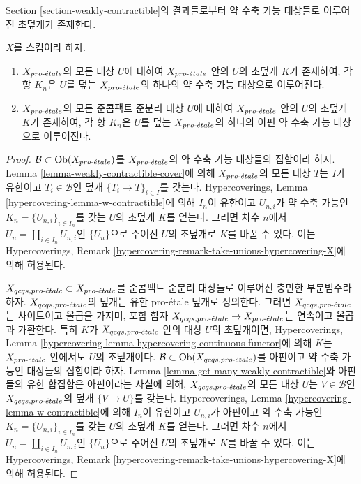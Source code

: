 \noindent
Section \ref{section-weakly-contractible}의 결과들로부터 약 수축 가능
대상들로 이루어진 초덮개가 존재한다.

\begin{lemma}
\label{lemma-w-contractible-hypercovering}
$X$를 스킴이라 하자.
\begin{enumerate}
\item $X_{pro\text{-}\acute{e}tale}$의 모든 대상 $U$에 대하여 $X_{pro\text{-}\acute{e}tale}$ 안의 $U$의
초덮개 $K$가 존재하여, 각 항 $K_n$은 $U$를 덮는 $X_{pro\text{-}\acute{e}tale}$의
하나의 약 수축 가능 대상으로 이루어진다.
\item $X_{pro\text{-}\acute{e}tale}$의 모든 준콤팩트 준분리 대상 $U$에 대하여
$X_{pro\text{-}\acute{e}tale}$ 안의 $U$의 초덮개 $K$가 존재하여, 각 항 $K_n$은
$U$를 덮는 $X_{pro\text{-}\acute{e}tale}$의 하나의 아핀 약 수축 가능 대상으로
이루어진다.
\end{enumerate}
\end{lemma}

\begin{proof}
$\mathcal{B} \subset \mathop{\mathrm{Ob}}\nolimits(X_{pro\text{-}\acute{e}tale})$를 $X_{pro\text{-}\acute{e}tale}$의 약 수축 가능
대상들의 집합이라 하자. Lemma \ref{lemma-weakly-contractible-cover}에
의해 $X_{pro\text{-}\acute{e}tale}$의 모든 대상 $T$는 $I$가 유한이고
$T_i \in \mathcal{B}$인 덮개 $\{T_i \to T\}_{i \in I}$를 갖는다.
Hypercoverings, Lemma \ref{hypercovering-lemma-w-contractible}에 의해
$I_n$이 유한이고 $U_{n, i}$가 약 수축 가능인
$K_n = \{U_{n, i}\}_{i \in I_n}$를 갖는 $U$의 초덮개 $K$를 얻는다.
그러면 차수 $n$에서 $U_n = \coprod_{i \in I_n} U_{n, i}$인
$\{U_n\}$으로 주어진 $U$의 초덮개로 $K$를 바꿀 수 있다.
이는 Hypercoverings, Remark
\ref{hypercovering-remark-take-unions-hypercovering-X}에 의해 허용된다.

\medskip\noindent
$X_{qcqs, {pro\text{-}\acute{e}tale}} \subset X_{pro\text{-}\acute{e}tale}$를 준콤팩트 준분리 대상들로
이루어진 충만한 부분범주라 하자. $X_{qcqs, {pro\text{-}\acute{e}tale}}$의 덮개는 유한
pro-\'etale 덮개로 정의한다. 그러면 $X_{qcqs, {pro\text{-}\acute{e}tale}}$는 사이트이고
올곱을 가지며, 포함 함자
$X_{qcqs, {pro\text{-}\acute{e}tale}} \to X_{pro\text{-}\acute{e}tale}$는 연속이고 올곱과 가환한다.
특히 $K$가 $X_{qcqs, {pro\text{-}\acute{e}tale}}$ 안의 대상 $U$의 초덮개이면,
Hypercoverings, Lemma
\ref{hypercovering-lemma-hypercovering-continuous-functor}에 의해 $K$는
$X_{pro\text{-}\acute{e}tale}$ 안에서도 $U$의 초덮개이다.
$\mathcal{B} \subset \mathop{\mathrm{Ob}}\nolimits(X_{qcqs, {pro\text{-}\acute{e}tale}})$를 아핀이고 약 수축
가능인 대상들의 집합이라 하자.
Lemma \ref{lemma-get-many-weakly-contractible}와 아핀들의 유한 합집합은
아핀이라는 사실에 의해, $X_{qcqs, {pro\text{-}\acute{e}tale}}$의 모든 대상 $U$는
$V \in \mathcal{B}$인 $X_{qcqs, {pro\text{-}\acute{e}tale}}$의 덮개
$\{V \to U\}$를 갖는다.
Hypercoverings, Lemma \ref{hypercovering-lemma-w-contractible}에 의해
$I_n$이 유한이고 $U_{n, i}$가 아핀이고 약 수축 가능인
$K_n = \{U_{n, i}\}_{i \in I_n}$를 갖는 $U$의 초덮개 $K$를 얻는다.
그러면 차수 $n$에서 $U_n = \coprod_{i \in I_n} U_{n, i}$인
$\{U_n\}$으로 주어진 $U$의 초덮개로 $K$를 바꿀 수 있다.
이는 Hypercoverings, Remark
\ref{hypercovering-remark-take-unions-hypercovering-X}에 의해 허용된다.
\end{proof}

